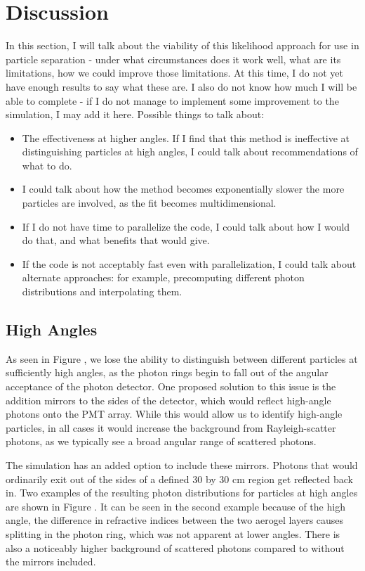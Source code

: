 
\chapter{Discussion}
\label{ch:Discussion}
In this section, I will talk about the viability of this likelihood approach for use in particle separation - under what circumstances does it work well, what are its limitations, how we could improve those limitations. At this time, I do not yet have enough results to say what these are. I also do not know how much I will be able to complete - if I do not manage to implement some improvement to the simulation, I may add it here. Possible things to talk about:
\begin{itemize}
\item The effectiveness at higher angles. If I find that this method is ineffective at distinguishing particles at high angles, I could talk about recommendations of what to do.
\item I could talk about how the method becomes exponentially slower the more particles are involved, as the fit becomes multidimensional.
\item If I do not have time to parallelize the code, I could talk about how I would do that, and what benefits that would give.
\item If the code is not acceptably fast even with parallelization, I could talk about alternate approaches: for example, precomputing different photon distributions and interpolating them.
\end{itemize}

\section{High Angles}
As seen in Figure , we lose the ability to distinguish between different particles at sufficiently high angles, as the photon rings begin to fall out of the angular acceptance of the photon detector.
One proposed solution to this issue is the addition mirrors to the sides of the detector, which would reflect high-angle photons onto the PMT array. 
While this would allow us to identify high-angle particles, in all cases it would increase the background from Rayleigh-scatter photons, as we typically see a broad angular range of scattered photons.

The simulation has an added option to include these mirrors.
Photons that would ordinarily exit out of the sides of a defined 30 by 30 cm region get reflected back in.
Two examples of the resulting photon distributions for particles at high angles are shown in Figure .
It can be seen in the second example because of the high angle, the difference in refractive indices between the two aerogel layers causes splitting in the photon ring, which was not apparent at lower angles.
There is also a noticeably higher background of scattered photons compared to without the mirrors included.

